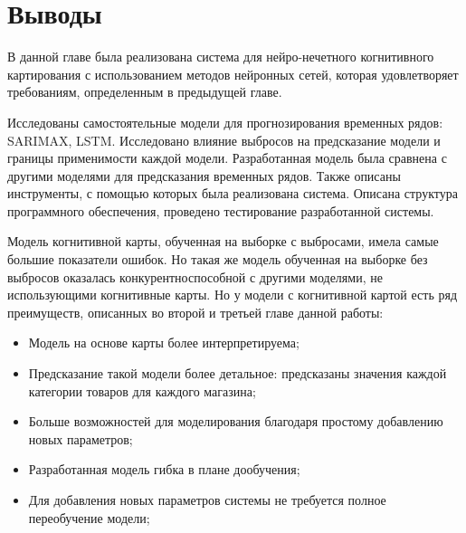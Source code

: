\section{Выводы}

В данной главе была реализована система для нейро-нечетного когнитивного картирования с использованием
методов нейронных сетей, которая удовлетворяет требованиям, определенным в предыдущей главе.

Исследованы самостоятельные модели для прогнозирования временных рядов:
SARIMAX, LSTM.
Исследовано влияние выбросов на предсказание модели и границы применимости каждой модели.
Разработанная модель была сравнена с другими моделями для предсказания временных рядов.
Также описаны инструменты, с помощью которых была реализована система.
Описана структура программного обеспечения, проведено тестирование разработанной системы.

Модель когнитивной карты, обученная на выборке с выбросами, имела самые большие показатели
ошибок. Но такая же модель обученная на выборке без выбросов
оказалась конкурентноспособной с другими моделями, не использующими
когнитивные карты. Но у модели с когнитивной картой есть ряд преимуществ,
описанных во второй и третьей главе данной работы:

\begin{itemize}
	\item Модель на основе карты более интерпретируема;
	\item Предсказание такой модели более детальное: предсказаны значения каждой категории товаров для каждого магазина;
	\item Больше возможностей для моделирования благодаря простому добавлению новых параметров;
	\item Разработанная модель гибка в плане дообучения;
	\item Для добавления новых параметров системы не требуется полное переобучение модели;
\end{itemize}

